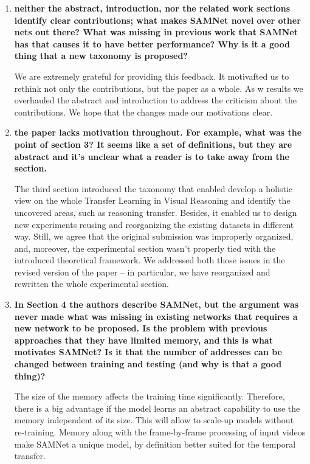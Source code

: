 \documentclass[10pt,twocolumn,letterpaper]{article}
\begin{document}
\begin{enumerate}

\item \textbf{neither the abstract, introduction, nor the related work sections identify clear contributions; what makes SAMNet novel over other nets out there? What was missing in previous work that SAMNet has that causes it to have better performance? Why is it a good thing that a new taxonomy is proposed?}

 We are extremely grateful for providing this feedback. It motivafted us to rethink not only the contributions, but the paper as a whole. As w results we overhauled the abstract and  introduction to address the criticism about the contributions. We hope that the changes made our motivations clear.

\item \textbf{the paper lacks motivation throughout. For example, what was the point of section 3? It seems like a set of definitions, but they are abstract and it's unclear what a reader is to take away from the section.}
 
The third section introduced the taxonomy that enabled develop a holistic view on the whole Transfer Learning in Visual Reasoning and identify the uncovered areas, such as reasoning transfer. Besides, it enabled us to design new experiments reusing and reorganizing the existing datasets in different way. Still, we agree that the original submission was improperly organized, and, moreover, the experimental section wasn't properly tied with the introduced theoretical framework. We addressed both those issues in the revised version of the paper -- in particular, we have reorganized and rewritten the whole experimental section.
 
\item \textbf{In Section 4 the authors describe SAMNet, but the argument was never made what was missing in existing networks that requires a new network to be proposed. Is the problem with previous approaches that they have limited memory, and this is what motivates SAMNet? Is it that the number of addresses can be changed between training and testing (and why is that a good thing)?}
 
The size of the memory affects the training time significantly. Therefore, there is a big advantage if the model learns an abstract capability to use the memory independent of its size.  This will allow to scale-up models without re-training. Memory along with the frame-by-frame processing of input videos make SAMNet a unique model, by definition better suited for the temporal transfer.

\end{enumerate}

% 
% 
\end{document}
